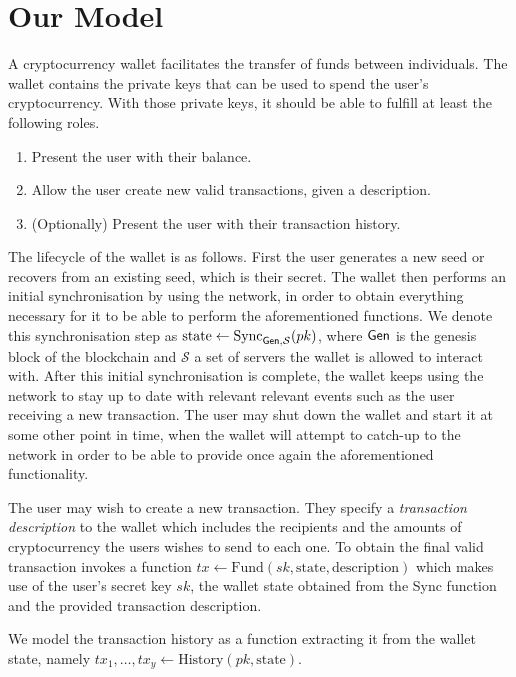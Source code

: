 \section{Our Model}
A cryptocurrency wallet facilitates the transfer of funds between individuals. The wallet contains the private keys that can be used to spend the user's cryptocurrency. With those private keys, it should be able to fulfill at least the following roles.

\begin{enumerate}
    \item Present the user with their balance.
    \item Allow the user create new valid transactions, given a description.
    \item (Optionally) Present the user with their transaction history.
\end{enumerate}

The lifecycle of the wallet is as follows. First the user generates a new seed or recovers from an existing seed, which is their secret. The wallet then performs an initial synchronisation by using the network, in order to obtain everything necessary for it to be able to perform the aforementioned functions. We denote this synchronisation step as $\text{state} \gets \text{Sync}_{\textsf{Gen}, \mathcal{S}}(pk)$, where $\textsf{Gen}$ is the genesis block of the blockchain and $\mathcal{S}$ a set of servers the wallet is allowed to interact with. After this initial synchronisation is complete, the wallet keeps using the network to stay up to date with relevant relevant events such as the user receiving a new transaction. The user may shut down the wallet and start it at some other point in time, when the wallet will attempt to catch-up to the network in order to be able to provide once again the aforementioned functionality.

The user may wish to create a new transaction. They specify a \emph{transaction description} to the wallet which includes the recipients and the amounts of cryptocurrency the users wishes to send to each one. To obtain the final valid transaction invokes a function $tx \gets \text{Fund}(sk, \text{state}, \text{description})$ which makes use of the user's secret key $sk$, the wallet state obtained from the Sync function and the provided transaction description.

We model the transaction history as a function extracting it from the wallet state, namely $tx_1, \dots, tx_y \gets \text{History}(pk, \text{state})$.

